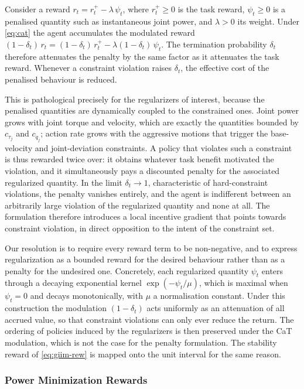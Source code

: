 Consider a reward $r_t = r^{+}_t - \lambda\, \psi_t$, where $r^{+}_t \ge 0$ is the task reward, $\psi_t \ge 0$ is a penalised quantity such as instantaneous joint power, and $\lambda>0$ its weight. Under \cref{eq:cat} the agent accumulates the modulated reward $(1-\delta_t)\,r_t = (1-\delta_t)\,r^{+}_t - \lambda (1-\delta_t)\,\psi_t$. The termination probability $\delta_t$ therefore attenuates the penalty by the same factor as it attenuates the task reward. Whenever a constraint violation raises $\delta_t$, the effective cost of the penalised behaviour is reduced.

This is pathological precisely for the regularizers of interest, because the penalised quantities are dynamically coupled to the constrained ones. Joint power grows with joint torque and velocity, which are exactly the quantities bounded by $c_{\tau_j}$ and $c_{\dot{q}_j}$; action rate grows with the aggressive motions that trigger the base-velocity and joint-deviation constraints. A policy that violates such a constraint is thus rewarded twice over: it obtains whatever task benefit motivated the violation, and it simultaneously pays a discounted penalty for the associated regularized quantity. In the limit $\delta_t \to 1$, characteristic of hard-constraint violations, the penalty vanishes entirely, and the agent is indifferent between an arbitrarily large violation of the regularized quantity and none at all. The formulation therefore introduces a local incentive gradient that points towards constraint violation, in direct opposition to the intent of the constraint set.

Our resolution is to require every reward term to be non-negative, and to express regularization as a bounded reward for the desired behaviour rather than as a penalty for the undesired one. Concretely, each regularized quantity $\psi_t$ enters through a decaying exponential kernel $\exp(-\psi_t/\mu)$, which is maximal when $\psi_t=0$ and decays monotonically, with $\mu$ a normalisation constant. Under this construction the modulation $(1-\delta_t)$ acts uniformly as an attenuation of all accrued value, so that constraint violations can only ever reduce the return. The ordering of policies induced by the regularizers is then preserved under the CaT modulation, which is not the case for the penalty formulation. The stability reward of \cref{eq:giim-rew} is mapped onto the unit interval for the same reason.

\subsubsection{Power Minimization Rewards}

